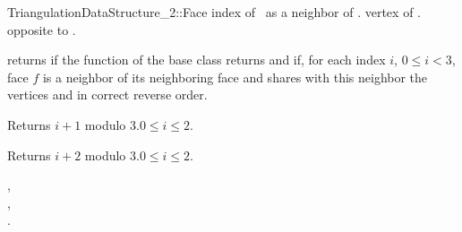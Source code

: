\begin{ccRefConcept}{TriangulationDataStructure_2::Face}
{index of \ccVar\ as a neighbor of \ccVar.}
\ccGlue
{}
{vertex of \ccVar.} opposite to  \ccVar.


\begin{ccAdvanced}

{returns  if  the function 
 of the base class
returns  and if, for each index $i$, $0 \le i < 3$,
face $f$ is a neighbor of its neighboring face 
and shares with this neighbor the  vertices  and 
in correct reverse order.}

\end{ccAdvanced}


{Returns $i+1$ modulo 3.\ccPrecond $0\leq i \leq 2$.}

{Returns $i+2$ modulo 3.\ccPrecond $0\leq i \leq 2$.}



\ccHasModels
{}


\ccSeeAlso
{}, \\
, \\
.


\end{ccRefConcept}


